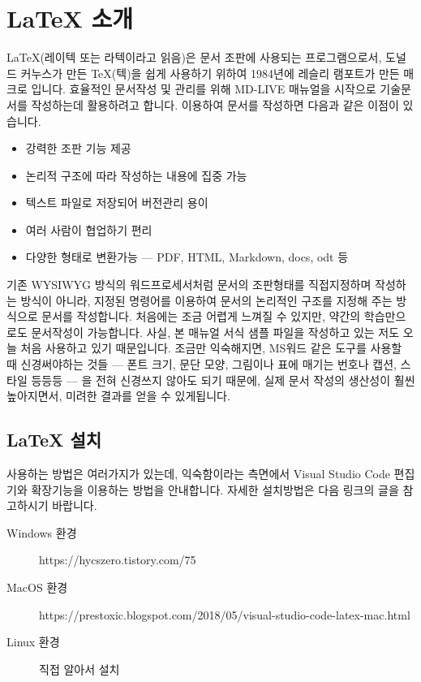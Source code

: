 
\chapter{\LaTeX{} 소개} %

\LaTeX(레이텍 또는 라텍이라고 읽음)은 문서 조판에 사용되는 프로그램으로서,
도널드 커누스가 만든 TeX(텍)을 쉽게 사용하기 위하여 1984년에 레슬리 램포트가 만든 매크로 입니다.
효율적인 문서작성 및 관리를 위해 MD-LIVE 매뉴얼을 시작으로 기술문서를 작성하는데  활용하려고 합니다.
 이용하여 문서를 작성하면 다음과 같은 이점이 있습니다.

\begin{itemize}
    \item 강력한 조판 기능 제공
    \item 논리적 구조에 따라 작성하는 내용에 집중 가능
    \item 텍스트 파일로 저장되어 버전관리 용이
    \item 여러 사람이 협업하기 편리
    \item 다양한 형태로 변환가능 --- PDF, HTML, Markdown, docs, odt 등
\end{itemize}

 기존 WYSIWYG 방식의 워드프로세서처럼 문서의 조판형태를 직접지정하며 작성하는 방식이 아니라,
지정된 명령어를 이용하여 문서의 논리적인 구조를 지정해 주는 방식으로 문서를 작성합니다.
처음에는 조금 어렵게 느껴질 수 있지만, 약간의 학습만으로도 문서작성이 가능합니다.
사실, 본 매뉴얼 서식 샘플 파일을 작성하고 있는 저도 오늘 처음  사용하고 있기 때문입니다.
조금만 익숙해지면, MS워드 같은 도구를 사용할 때 신경써야하는 것들 --- 폰트 크기, 문단 모양, 
그림이나 표에 매기는 번호나 캡션, 스타일 등등등 --- 을 전혀 신경쓰지 않아도 되기 때문에, 실제 
문서 작성의 생산성이 훨씬 높아지면서, 미려한 결과를 얻을 수 있게됩니다.

\section{\LaTeX{} 설치}
 사용하는 방법은 여러가지가 있는데, 익숙함이라는 측면에서 Visual Studio Code 편집기와 
확장기능을 이용하는 방법을 안내합니다. 자세한 설치방법은 다음 링크의 글을 참고하시기 바랍니다.

\begin{description}
    \item[Windows 환경] https://hycszero.tistory.com/75
    \item[MacOS 환경] https://prestoxic.blogspot.com/2018/05/visual-studio-code-latex-mac.html
    \item[Linux 환경] 직접 알아서 설치
\end{description}

